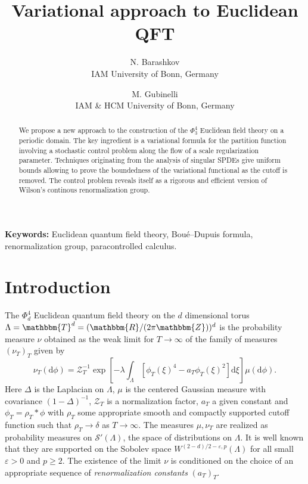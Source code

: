 \documentclass[11pt, oneside]{article}   	%
\newcommand{\mathd}{\mathrm{d}}
\newcommand{\tmaffiliation}[1]{\\ #1}
\newcommand{\tmtextit}[1]{{\itshape{#1}}}
\newcommand{\tmkeywords}{\textbf{Keywords:} }
\newcommand{\CS}{\mathscr{S}}
\newcommand{\CZ}{\mathscr{Z}}
\begin{document}
\title{Variational approach to Euclidean QFT}

\author{
  N. Barashkov
  \tmaffiliation{IAM University of Bonn, Germany}
  \and
  M. Gubinelli
  \tmaffiliation{IAM \& HCM University of Bonn, Germany}
}

\maketitle

\begin{abstract}
  We propose a new approach to the construction of the $\Phi^4_{3}$
  Euclidean field theory on a periodic domain. The key ingredient is a
  variational formula for the partition function involving a stochastic
  control problem along the flow of a scale regularization parameter.
  Techniques originating from the analysis of singular SPDEs give uniform
  bounds allowing to prove the boundedness of the variational functional as
  the cutoff is removed. The control problem reveals itself as a rigorous and
  efficient version of Wilson's continous renormalization group.
\end{abstract}

\tmkeywords{Euclidean quantum field theory, Bou{\'e}--Dupuis formula,
renormalization group, paracontrolled calculus.}

\section{Introduction }

The $\Phi^4_d$ Euclidean quantum field theory on the $d$ dimensional torus
$\Lambda =\mathbbm{T}^d = (\mathbbm{R}/ (2 \pi \mathbbm{Z}))^d$ is the
probability measure $\nu$ obtained as the weak limit for $T \rightarrow
\infty$ of the family of measures $(\nu_T)_T$ given by
\begin{equation}
  \nu_T (\mathd \phi) = \CZ^{- 1}_T \exp \left[ - \lambda \int_{\Lambda}
  [\phi_T (\xi)^4 - a_T \phi_T (\xi)^2] \mathd \xi \right] \mu (\mathd \phi)
  \label{eq:gibbs} .
\end{equation}
Here $\Delta$ is the Laplacian on $\Lambda$, $\mu$ is the centered Gaussian
measure with covariance $(1 - \Delta)^{- 1}$, $\CZ_T$ is a normalization
factor, $a_T$ a given constant and $\phi_T = \rho_T \ast \phi$ with $\rho_T$
some appropriate smooth and compactly supported cutoff function such that
$\rho_T \rightarrow \delta$ as $T \rightarrow \infty$. The measures $\mu,
\nu_T$ are realized as probability measures on $\CS' (\Lambda)$, the space of
distributions on $\Lambda$. It is well known that they are supported on the
Sobolev space $W^{(2 - d) / 2 - \varepsilon, p} (\Lambda)$ for all small
$\varepsilon > 0$ and $p \geqslant 2$. The existence of the limit $\nu$ is
conditioned on the choice of an appropriate sequence of
\tmtextit{renormalization constants} $(a_T)_T$.
\end{document}
